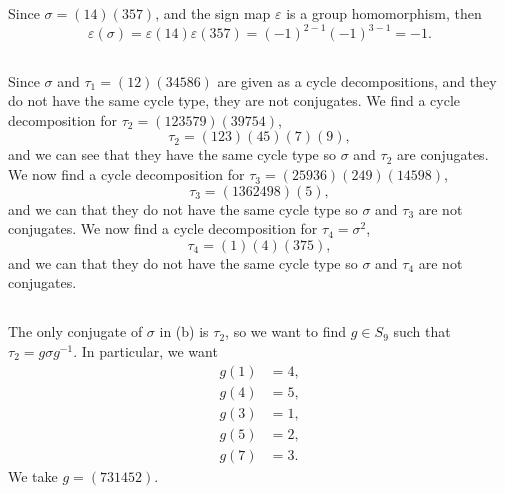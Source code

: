 \documentclass[12pt]{article}
\newcommand{\eps}{\varepsilon}
\newcommand{\<}{\left\langle}
\renewcommand{\>}{\right\rangle}
\begin{document}
\section{}

\subsection{}
Since $\sigma = (14)(357)$, and the sign map $\eps$ is a group homomorphism, then
\[
    \eps(\sigma) = \eps(14)\eps(357) = (-1)^{2-1} (-1)^{3-1} = -1.
\]

\subsection{}
Since $\sigma$ and $\tau_1 = (12)(34586)$ are given as a cycle decompositions, and they do not have the same cycle type, they are not conjugates. We find a cycle decomposition for $\tau_2 =  (123579)(39754)$,
\[
    \tau_2 = (123)(45)(7)(9),
\]
and we can see that they have the same cycle type so $\sigma$ and $\tau_2$ are conjugates. We now find a cycle decomposition for $\tau_3 = (25936)(249)(14598)$,
\[
    \tau_3 = (1362498)(5),
\]
and we can that they do not have the same cycle type so $\sigma$ and $\tau_3$ are not conjugates. We now find a cycle decomposition for $\tau_4 = \sigma^2$,
\[
    \tau_4 = (1)(4)(375),
\]
and we can that they do not have the same cycle type so $\sigma$ and $\tau_4$ are not conjugates.


\subsection{}
The only conjugate of $\sigma$ in (b) is $\tau_2$, so we want to find $g \in S_9$ such that $\tau_2 = g\sigma g^{-1}$. In particular, we want
\begin{align*}
    g(1) &= 4, \\
    g(4) &= 5, \\
    g(3) &= 1, \\
    g(5) &= 2, \\
    g(7) &= 3.
\end{align*}
We take $g = (731452)$.

\newpage
\end{document}
